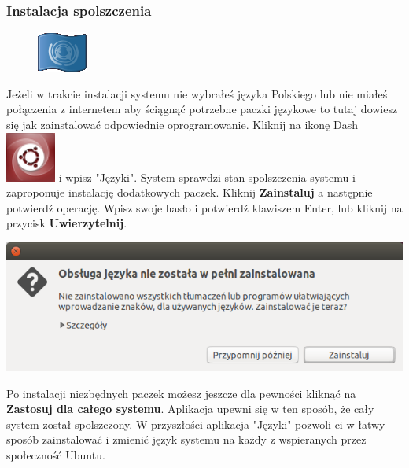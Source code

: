\subsubsection{Instalacja spolszczenia}
\begin{figure}
        \includegraphics[width=\linewidth]{images/pierwsze_uruchomienie_lang1.png}
\end{figure}
Jeżeli w trakcie instalacji systemu nie wybrałeś języka Polskiego lub nie miałeś połączenia z internetem aby ściągnąć potrzebne paczki językowe to tutaj dowiesz się jak zainstalować odpowiednie oprogramowanie.
Kliknij na ikonę Dash \includegraphics[scale=0.35]{images/ikony_dash.png} i wpisz "Języki". System sprawdzi stan spolszczenia systemu i zaproponuje instalację dodatkowych paczek. Kliknij \textbf{Zainstaluj} a następnie potwierdź operację. Wpisz swoje hasło i potwierdź klawiszem Enter, lub kliknij na przycisk \textbf{Uwierzytelnij}.
\begin{center}
        \includegraphics{images/pierwsze_uruchomienie_lang2.png}
\end{center}
Po instalacji niezbędnych paczek możesz jeszcze dla pewności kliknąć na \textbf{Zastosuj dla całego systemu}. Aplikacja upewni się w ten sposób, że cały system został spolszczony.
W przyszłości aplikacja "Języki" pozwoli ci w łatwy sposób zainstalować i zmienić język systemu na każdy z wspieranych przez społeczność Ubuntu.
\clearpage
